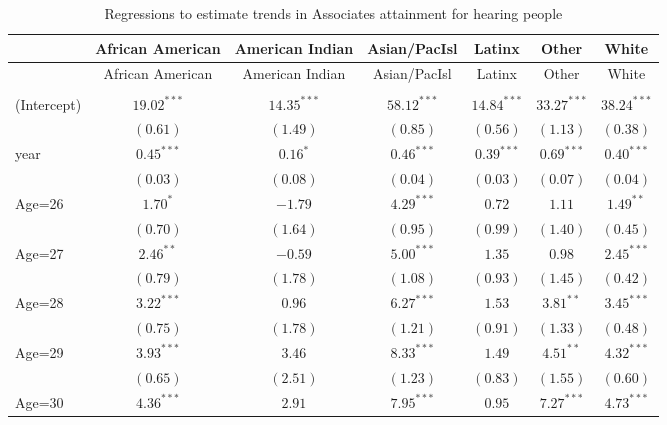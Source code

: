 \documentclass[fullpage]{paper}
\begin{document}
\begin{center}
\begin{longtable}{l c c c c c c }
\hline
 & African American & American Indian & Asian/PacIsl & Latinx & Other & White \\
\hline
\endfirsthead
\hline
 & African American & American Indian & Asian/PacIsl & Latinx & Other & White \\
\hline
\endhead
\hline
\endfoot
\hline
\multicolumn{7}{l}{\scriptsize{$^{***}p<0.001$, $^{**}p<0.01$, $^*p<0.05$}}\\
\caption{Regressions to estimate trends in Associates attainment for hearing people}
\label{table:coefficients}
\endlastfoot
(Intercept) & $19.02^{***}$ & $14.35^{***}$ & $58.12^{***}$  & $14.84^{***}$ & $33.27^{***}$ & $38.24^{***}$ \\
            & $(0.61)$      & $(1.49)$      & $(0.85)$       & $(0.56)$      & $(1.13)$      & $(0.38)$      \\
year        & $0.45^{***}$  & $0.16^{*}$    & $0.46^{***}$   & $0.39^{***}$  & $0.69^{***}$  & $0.40^{***}$  \\
            & $(0.03)$      & $(0.08)$      & $(0.04)$       & $(0.03)$      & $(0.07)$      & $(0.04)$      \\
Age=26      & $1.70^{*}$    & $-1.79$       & $4.29^{***}$   & $0.72$        & $1.11$        & $1.49^{**}$   \\
            & $(0.70)$      & $(1.64)$      & $(0.95)$       & $(0.99)$      & $(1.40)$      & $(0.45)$      \\
Age=27      & $2.46^{**}$   & $-0.59$       & $5.00^{***}$   & $1.35$        & $0.98$        & $2.45^{***}$  \\
            & $(0.79)$      & $(1.78)$      & $(1.08)$       & $(0.93)$      & $(1.45)$      & $(0.42)$      \\
Age=28      & $3.22^{***}$  & $0.96$        & $6.27^{***}$   & $1.53$        & $3.81^{**}$   & $3.45^{***}$  \\
            & $(0.75)$      & $(1.78)$      & $(1.21)$       & $(0.91)$      & $(1.33)$      & $(0.48)$      \\
Age=29      & $3.93^{***}$  & $3.46$        & $8.33^{***}$   & $1.49$        & $4.51^{**}$   & $4.32^{***}$  \\
            & $(0.65)$      & $(2.51)$      & $(1.23)$       & $(0.83)$      & $(1.55)$      & $(0.60)$      \\
Age=30      & $4.36^{***}$  & $2.91$        & $7.95^{***}$   & $0.95$        & $7.27^{***}$  & $4.73^{***}$  \\

\end{longtable}
\end{center}
\end{document}
